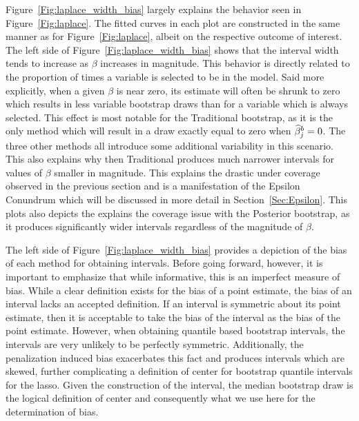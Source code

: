 Figure~\ref{Fig:laplace_width_bias} largely explains the behavior seen in Figure~\ref{Fig:laplace}. The fitted curves in each plot are constructed in the same manner as for Figure~\ref{Fig:laplace}, albeit on the respective outcome of interest. The left side of Figure~\ref{Fig:laplace_width_bias} shows that the interval width tends to increase as $\beta$ increases in magnitude. This behavior is directly related to the proportion of times a variable is selected to be in the model. Said more explicitly, when a given $\beta$ is near zero, its estimate will often be shrunk to zero which results in less variable bootstrap draws than for a variable which is always selected. This effect is most notable for the Traditional bootstrap, as it is the only method which will result in a draw exactly equal to zero when $\widehat{\beta}^b_j = 0$. The three other methods all introduce some additional variability in this scenario. This also explains why then Traditional produces much narrower intervals for values of $\beta$ smaller in magnitude. This explains the drastic under coverage observed in the previous section and is a manifestation of the Epsilon Conundrum which will be discussed in more detail in Section~\ref{Sec:Epsilon}. This plots also depicts the explains the coverage issue with the Posterior bootstrap, as it produces significantly wider intervals regardless of the magnitude of $\beta$.



The left side of Figure~\ref{Fig:laplace_width_bias} provides a depiction of the bias of each method for obtaining intervals. Before going forward, however, it is important to emphasize that while informative, this is an imperfect measure of bias. While a clear definition exists for the bias of a point estimate, the bias of an interval lacks an accepted definition. If an interval is symmetric about its point estimate, then it is acceptable to take the bias of the interval as the bias of the point estimate. However, when obtaining quantile based bootstrap intervals, the intervals are very unlikely to be perfectly symmetric. Additionally, the penalization induced bias exacerbates this fact and produces intervals which are skewed, further complicating a definition of center for bootstrap quantile intervals for the lasso. Given the construction of the interval, the median bootstrap draw is the logical definition of center and consequently what we use here for the determination of bias.


